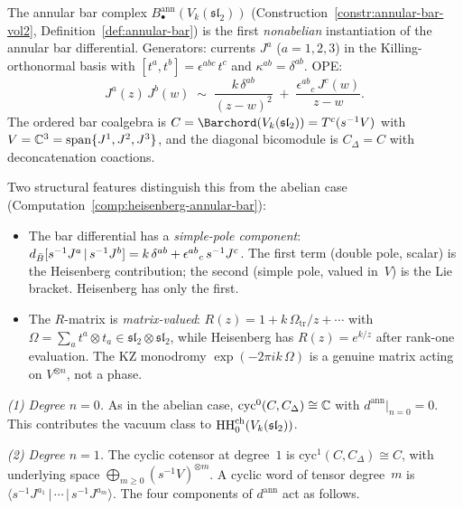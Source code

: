 \begin{computation}%
\label{comp:affine-sl2-annular-bar}%
%
%
%
The annular bar complex
$B^{\mathrm{ann}}_\bullet(V_k(\mathfrak{sl}_2))$
(Construction~\ref{constr:annular-bar-vol2},
Definition~\ref{def:annular-bar}) is the first
\emph{nonabelian} instantiation of the annular bar
differential. Generators: currents $J^a$ ($a=1,2,3$)
in the Killing-orthonormal basis with
$[t^a, t^b] = \epsilon^{abc}\, t^c$ and
$\kappa^{ab} = \delta^{ab}$. OPE:
\begin{equation}\label{eq:sl2-ann-ope}
J^a(z)\, J^b(w)
\;\sim\;
\frac{k\,\delta^{ab}}{(z-w)^2}
\;+\;
\frac{\epsilon^{ab}{}_c\, J^c(w)}{z-w}.
\end{equation}
The ordered bar coalgebra is $C = \Barchord(V_k(\mathfrak{sl}_2))
= T^c(s^{-1}V)$ with $V = \mathbb{C}^3 = \mathrm{span}\{J^1,J^2,J^3\}$,
and the diagonal bicomodule is $C_\Delta = C$
with deconcatenation coactions.

Two structural features distinguish this from the
abelian case (Computation~\ref{comp:heisenberg-annular-bar}):
\begin{itemize}
\item The bar differential has a \emph{simple-pole component}:
 $d_{\bar{B}}[s^{-1}J^a\,|\,s^{-1}J^b]
 = k\,\delta^{ab} + \epsilon^{ab}{}_c\, s^{-1}J^c$.
 The first term (double pole, scalar) is the Heisenberg
 contribution; the second (simple pole, valued in~$V$)
 is the Lie bracket. Heisenberg has only the first.
\item The $R$-matrix is \emph{matrix-valued}:
 $R(z) = 1 + k\,\Omega_{\mathrm{tr}}/z + \cdots$ with
 $\Omega = \sum_a t^a \otimes t_a \in
 \mathfrak{sl}_2 \otimes \mathfrak{sl}_2$,
 while Heisenberg has $R(z) = e^{k/z}$ after rank-one evaluation.
 The KZ monodromy $\exp(-2\pi ik\,\Omega)$ is a
 genuine matrix acting on $V^{\otimes n}$, not a phase.
\end{itemize}

\smallskip
\noindent
\emph{(1) Degree $n=0$.}
As in the abelian case,
$\mathrm{cyc}^0(C,C_\Delta) \cong \mathbb{C}$
with $d^{\mathrm{ann}}|_{n=0} = 0$. This contributes the
vacuum class to $\operatorname{HH}^{\mathrm{ch}}_0(V_k(\mathfrak{sl}_2))$.

\smallskip
\noindent
\emph{(2) Degree $n=1$.}
The cyclic cotensor at degree~$1$ is
$\mathrm{cyc}^1(C,C_\Delta) \cong C$,
with underlying space
$\bigoplus_{m \ge 0} (s^{-1}V)^{\otimes m}$.
A cyclic word of tensor degree~$m$ is
$\langle s^{-1}J^{a_1}\,|\,\cdots\,|\,s^{-1}J^{a_m}\rangle$.
The four components of $d^{\mathrm{ann}}$ act as follows.


\end{computation}
